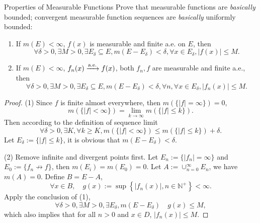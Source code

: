 \begin{example}{Properties of Measurable Functions}{}
  Prove that measurable functions are \emph{basically} bounded;
  convergent measurable function sequences are \emph{basically} uniformly bounded:
  \begin{enumerate}
  \item If $m(E) < \infty$, $f(x)$ is measurable and finite a.e. on $E$, then
    \begin{equation}
      \forall \delta > 0, \exists M > 0, \exists E_{\delta} \subseteq E, m(E - E_{\delta}) < \delta,
      \forall x \in E_{\delta}, |f(x)| \leq M.
    \end{equation}
  \item If $m(E) < \infty$, $f_n(x) \xrightarrow{\text{a.e.}} f(x)$, both $f_n, f$ are measurable
    and finite a.e., then
    \begin{equation}
      \forall \delta > 0, \exists M > 0, \exists E_{\delta} \subseteq E, m(E - E_{\delta}) < \delta,
      \forall n, \forall x \in E_{\delta}, |f_n(x)| \leq M.
    \end{equation}
  \end{enumerate}
\end{example}

\begin{proof}
  (1) Since $f$ is finite almost everywhere, then $m(\{|f| = \infty\}) = 0$,
  \begin{equation}
    m(\{|f| < \infty\})
    = \lim \limits _{k \rightarrow \infty} m(\{|f| \leq k\}).
  \end{equation}
  Then according to the definition of sequence limit
  \begin{equation}
    \forall \delta > 0, \exists K, \forall k \geq K,
    m(\{|f| < \infty\}) \leq m(\{|f| \leq k\}) + \delta.
  \end{equation}
  Let $E_{\delta} := \{|f| \leq k\}$, it is obvious that $m(E - E_{\delta}) < \delta$.

  (2) Remove infinite and divergent points first.
  Let $E_n := \{|f_n| = \infty\}$ and $E_0 := \{f_n \not \rightarrow f\}$,
  then $m(E_i) = m(E_0) = 0$.
  Let $A := \cup _{n = 0}^{\infty} E_n$, we have $m(A) = 0$.
  Define $B = E - A$,
  \begin{equation}
    \forall x \in B, \quad g(x) := \sup \left\{ |f_n(x)| , n \in \mathbb{N}^+\right\} < \infty.
  \end{equation}
  Apply the conclusion of (1),
  \begin{equation}
    \forall \delta > 0, \exists M > 0, \exists E_{\delta}, m(E - E_{\delta})
    \quad g(x) \leq M,
  \end{equation}
  which also implies that for all $n > 0$ and $x \in D$, $|f_n(x)| \leq M$.
\end{proof}

